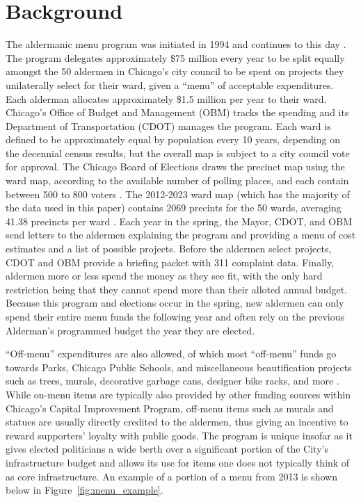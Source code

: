 \section{Background}\label{sec:background}

The aldermanic menu program was initiated in 1994 and continues to this day \citep{OIGaudit}. 
The program delegates approximately \$75 million every year to be split equally amongst the 50 aldermen in Chicago's city council to be spent on projects they unilaterally select for their ward, given a ``menu'' of acceptable expenditures. 
Each alderman allocates approximately \$1.5 million per year to their ward.
Chicago's Office of Budget and Management (OBM) tracks the spending and its Department of Transportation (CDOT) manages the program.
Each ward is defined to be approximately equal by population every 10 years, depending on the decennial census results, but the overall map is subject to a city council vote for approval.
The Chicago Board of Elections draws the precinct map using the ward map, according to the available number of polling places, and each contain between 500 to 800 voters \citep{Crowley_2022}.
The 2012-2023 ward map (which has the majority of the data used in this paper) contains 2069 precints for the 50 wards, averaging 41.38 precincts per ward \citep{Crowley_2022}.
Each year in the spring, the Mayor, CDOT, and OBM send letters to the aldermen explaining the program and providing a menu of cost estimates and a list of possible projects.
Before the aldermen select projects, CDOT and OBM provide a briefing packet with 311 complaint data.
Finally, aldermen more or less spend the money as they see fit, with the only hard restriction being that they cannot spend more than their alloted annual budget.
Because this program and elections occur in the spring, new aldermen can only spend their entire menu funds the following year and often rely on the previous Alderman's programmed budget the year they are elected.

``Off-menu'' expenditures are also allowed, of which most ``off-menu'' funds go towards Parks, Chicago Public Schools, and miscellaneous beautification projects such as trees, murals, decorative garbage cans, designer bike racks, and more \citep{OIGaudit}. 
While on-menu items are typically also provided by other funding sources within Chicago's Capital Improvement Program, off-menu items such as murals and statues are usually directly credited to the aldermen, thus giving an incentive to reward supporters' loyalty with public goods.
The program is unique insofar as it gives elected politicians a wide berth over a significant portion of the City's infrastructure budget and allows its use for items one does not typically think of as core infrastructure. 
An example of a portion of a menu from 2013 is shown below in Figure~\ref{fig:menu_example}.


